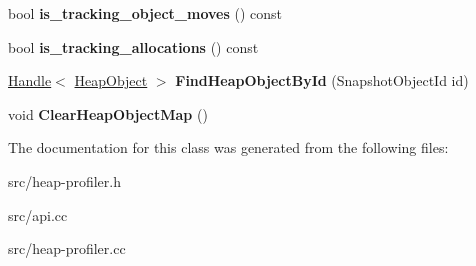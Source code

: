\begin{DoxyCompactItemize}
\item 
\hypertarget{classv8_1_1internal_1_1_heap_profiler_ade0e230273e763a248b5ee7ffdbf92ce}{}bool {\bfseries is\+\_\+tracking\+\_\+object\+\_\+moves} () const \label{classv8_1_1internal_1_1_heap_profiler_ade0e230273e763a248b5ee7ffdbf92ce}

\item 
\hypertarget{classv8_1_1internal_1_1_heap_profiler_a7e91fb5deacee6c270a6e0a0def9bd79}{}bool {\bfseries is\+\_\+tracking\+\_\+allocations} () const \label{classv8_1_1internal_1_1_heap_profiler_a7e91fb5deacee6c270a6e0a0def9bd79}

\item 
\hypertarget{classv8_1_1internal_1_1_heap_profiler_adf0791d9132710ee924b9e5c0bacd486}{}\hyperlink{classv8_1_1internal_1_1_handle}{Handle}$<$ \hyperlink{classv8_1_1internal_1_1_heap_object}{Heap\+Object} $>$ {\bfseries Find\+Heap\+Object\+By\+Id} (Snapshot\+Object\+Id id)\label{classv8_1_1internal_1_1_heap_profiler_adf0791d9132710ee924b9e5c0bacd486}

\item 
\hypertarget{classv8_1_1internal_1_1_heap_profiler_aabb83158ff4b7d07a8972e140217d696}{}void {\bfseries Clear\+Heap\+Object\+Map} ()\label{classv8_1_1internal_1_1_heap_profiler_aabb83158ff4b7d07a8972e140217d696}

\end{DoxyCompactItemize}


The documentation for this class was generated from the following files\+:\begin{DoxyCompactItemize}
\item 
src/heap-\/profiler.\+h\item 
src/api.\+cc\item 
src/heap-\/profiler.\+cc\end{DoxyCompactItemize}
